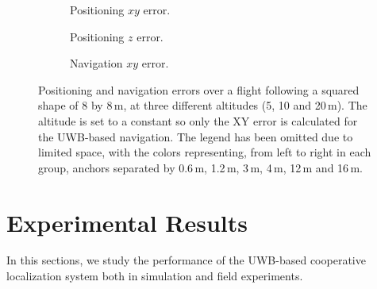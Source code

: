 
\begin{figure*}
    \centering
    \begin{subfigure}{0.32\textwidth}
        \centering
        \setlength\figureheight{\textwidth}
        \setlength\figurewidth{\textwidth}
        \footnotesize{}
        \caption{Positioning $xy$ error.}
        \label{fig:square_pos_xy}
    \end{subfigure}
    \begin{subfigure}{0.32\textwidth}
        \centering
        \setlength\figureheight{\textwidth}
        \setlength\figurewidth{\textwidth}
        \footnotesize{}
        \caption{Positioning $z$ error.}
        \label{fig:square_pos_z}
    \end{subfigure}
        \begin{subfigure}{0.32\textwidth}
        \centering
        \setlength\figureheight{\textwidth}
        \setlength\figurewidth{\textwidth}
        \footnotesize{}
        \caption{Navigation $xy$ error.}
        \label{fig:square_nav}
    \end{subfigure}
    \caption{Positioning and navigation errors over a flight following a squared shape of 8 by 8\,m, at three different altitudes (5, 10 and 20\,m). The altitude is set to a constant so only the XY error is calculated for the UWB-based navigation. The legend has been omitted due to limited space, with the colors representing, from left to right in each group, anchors separated by 0.6\,m, 1.2\,m, 3\,m, 4\,m, 12\,m and 16\,m.}
    \label{fig:square_sim}
\end{figure*}   

\section{Experimental Results}

In this sections, we study the performance of the UWB-based cooperative localization system both in simulation and field experiments. 




